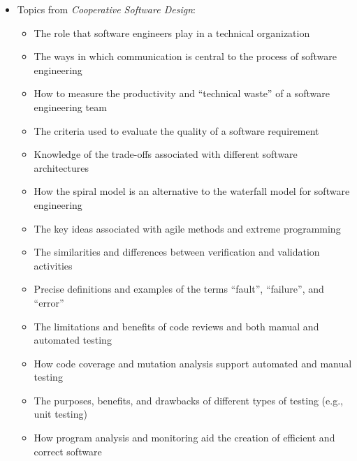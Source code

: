 \documentclass[11pt]{article}
\newcommand{\cooperative}{{\em Cooperative Software Design\/}}
\begin{document}
\begin{itemize}
\begin{itemize}
    \end{itemize}

  \item Topics from \cooperative{}:
    \vspace*{-.05in}
    \begin{itemize}

      \itemsep 0.1in

      \item The role that software engineers play in a technical organization

      \item The ways in which communication is central to the process of
        software engineering

      \item How to measure the productivity and ``technical waste'' of a
        software engineering team

      \item The criteria used to evaluate the quality of a software requirement

      \item Knowledge of the trade-offs associated with different software
        architectures

      \item How the spiral model is an alternative to the waterfall model for
        software engineering

      \item The key ideas associated with agile methods and extreme programming

      \item The similarities and differences between verification and validation
        activities

      \item Precise definitions and examples of the terms ``fault'',
        ``failure'', and ``error''

      \item The limitations and benefits of code reviews and both manual and
        automated testing

      \item How code coverage and mutation analysis support automated and manual
        testing

      \item The purposes, benefits, and drawbacks of different types of testing
        (e.g., unit testing)

      \item How program analysis and monitoring aid the creation of efficient
        and correct software


\end{itemize}
\end{itemize}
\end{document}
